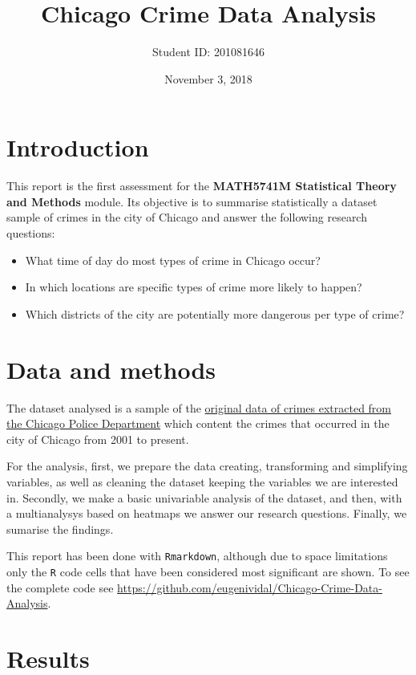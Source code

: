 \documentclass[]{article}
\title{Chicago Crime Data Analysis}
\author{Student ID: 201081646}
\date{November 3, 2018}
\begin{document}
\maketitle

\section{Introduction}\label{introduction}

This report is the first assessment for the \textbf{MATH5741M
Statistical Theory and Methods} module. Its objective is to summarise
statistically a dataset sample of crimes in the city of Chicago and
answer the following research questions:

\begin{itemize}
\item
  What time of day do most types of crime in Chicago occur?
\item
  In which locations are specific types of crime more likely to happen?
\item
  Which districts of the city are potentially more dangerous per type of
  crime?
\end{itemize}

\section{Data and methods}\label{data-and-methods}

The dataset analysed is a sample of the
\href{https://data.cityofchicago.org/Public-Safety/Crimes-2001-to-present/ijzp-q8t2}{original
data of crimes extracted from the Chicago Police Department} which
content the crimes that occurred in the city of Chicago from 2001 to
present.

For the analysis, first, we prepare the data creating, transforming and
simplifying variables, as well as cleaning the dataset keeping the
variables we are interested in. Secondly, we make a basic univariable
analysis of the dataset, and then, with a multianalysys based on
heatmaps we answer our research questions. Finally, we sumarise the
findings.

This report has been done with \texttt{Rmarkdown}, although due to space
limitations only the \texttt{R} code cells that have been considered
most significant are shown. To see the complete code see
\url{https://github.com/eugenividal/Chicago-Crime-Data-Analysis}.

\section{Results}\label{results}
\end{document}
